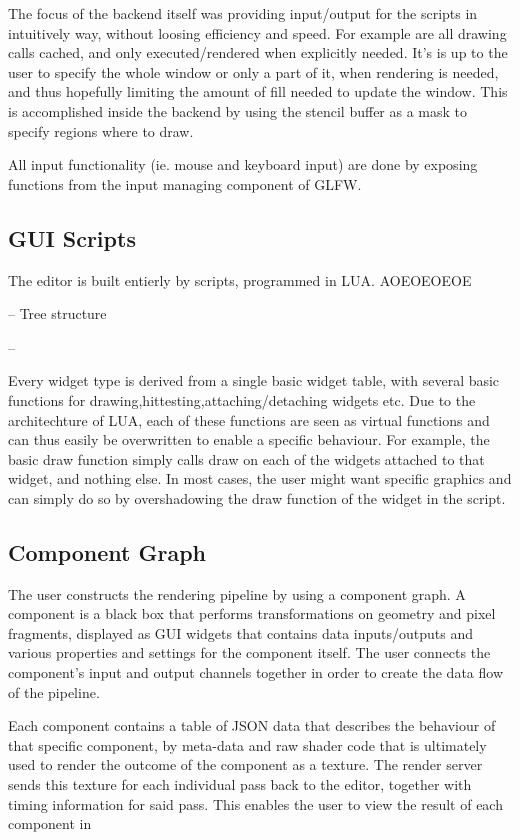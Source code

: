 The focus of the backend itself was providing input/output for the scripts in intuitively way, without loosing efficiency and speed. For example are all drawing calls cached, and only executed/rendered when explicitly needed. It's is up to the user to specify the whole window or only a part of it, when rendering is needed, and thus hopefully limiting the amount of fill needed to update the window. This is accomplished inside the backend by using the stencil buffer as a mask to specify regions where to draw.

All input functionality (ie. mouse and keyboard input) are done by exposing functions from the input managing component of GLFW.

\subsection{GUI Scripts}
The editor is built entierly by scripts, programmed in LUA. AOEOEOEOE

-- Tree structure


-- 

Every widget type is derived from a single basic widget table, with several basic functions for drawing,hittesting,attaching/detaching widgets etc. Due to the architechture of LUA, each of these functions are seen as virtual functions and can thus easily be overwritten to enable a specific behaviour. For example, the basic draw function simply calls draw on each of the widgets attached to that widget, and nothing else. In most cases, the user might want specific graphics and can simply do so by overshadowing the draw function of the widget in the script. 

\subsection{Component Graph}
The user constructs the rendering pipeline by using a component graph. A component is a black box that performs transformations on geometry and pixel fragments, displayed as GUI widgets that contains data inputs/outputs and various properties and settings for the component itself. The user connects the component’s input and output channels together in order to create the data flow of the pipeline. 

Each component contains a table of JSON data that describes the behaviour of that specific component, by meta-data and raw shader code that is ultimately used to render the outcome of the component as a texture. The render server sends this texture for each individual pass back to the editor, together with timing information for said pass. This enables the user to view the result of each component in 

